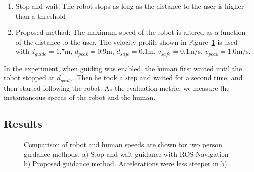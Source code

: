 \begin{enumerate}
\item Stop-and-wait: The robot stops as long as the distance to the user is higher than a threshold
\item Proposed method: The maximum speed of the robot is altered as a function of the distance to the user. The velocity profile shown in Figure~\ref{fig:guidance_performance_graph} is used with $d_{guide}=1.7$m, $d_{peak}=0.9$m, $d_{safe}=0.1$m, $v_{safe}=0.1$m/s, $v_{peak}=1.0$m/s.
\end{enumerate}

In the experiment, when guiding was enabled, the human first waited until the robot stopped at $d_{guide}$. Then he took a step and waited for a second time, and then started following the robot. As the evaluation metric, we measure the instantaneous speeds of the robot and the human.

\subsection{Results}
\label{sec:guidance_results}


\begin{figure}[ht!]
\centering
%
        
    \caption{%
	Comparison of robot and human speeds are shown for two person guidance methods. a) Stop-and-wait guidance with ROS Navigation b) Proposed guidance method. Accelerations were less steeper in b).
     }%
   \label{fig:guidance_performance_graph}
\end{figure}


